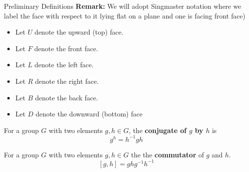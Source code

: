 \documentclass[final]{beamer}
\newlength{\colwidth}
\begin{document}
\begin{frame}[t]
\begin{columns}[t]
\begin{column}{\colwidth}
\begin{alertblock}{Preliminary Definitions}
\textbf{Remark:} 
We will adopt Singmaster notation where  
we label the face with respect to it lying
flat on a plane and one is facing front face)

\begin{itemize}
\item Let $U$ denote the upward (top) face.
\item Let $F$ denote the front face.
\item Let $L$ denote the left face.
\item Let $R$ denote the right face.
\item Let $B$ denote the back face.
\item Let $D$ denote the downward (bottom) face
\end{itemize}

For a group $G$ with two elements $g,h \in G$, the \textbf{conjugate of $g$ by $h$} is
$$g^h = h^{-1}gh$$

For a group $G$ with two elements $g,h \in G$ the 
the \textbf{commutator} of $g$ and $h$.
$$[g,h]=ghg^{-1}h^{-1}$$







\end{alertblock}
\end{column}
\end{columns}
\end{frame}
\end{document}

